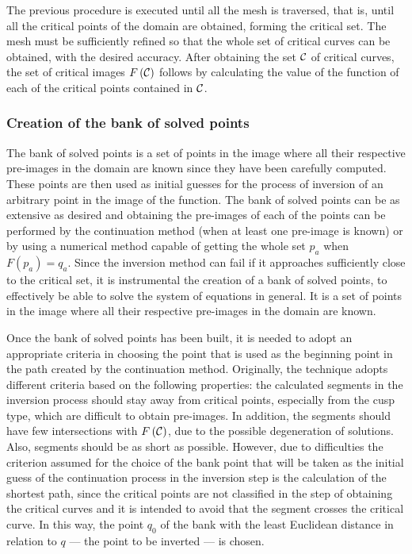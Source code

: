 \documentclass[journal=iecred,manuscript=article]{achemso}
\theoremstyle{definition}
\theoremstyle{remark}
\begin{document}
The previous procedure is executed until all the mesh is traversed, that is, until all the critical points of the domain are obtained, forming the critical set. 
 The mesh must be sufficiently refined so that the
 whole set of  critical curves can be obtained,
  with the desired accuracy. After obtaining the set $ {\cal C} $ of critical curves, the set of critical images 
  $F\left({\cal C}\right) $ follows by calculating the value of the function of each of the critical points contained in $ {\cal C} $.

\subsubsection{Creation of the bank of solved points}
The bank of solved points is a set of points in the image 
where all their respective pre-images in the 
domain are known since they have been carefully 
computed. 
These points are then used as initial guesses for the process 
of inversion of an arbitrary point in the image of the 
function. The bank of solved points can be as extensive as desired and obtaining the pre-images of each of the points can be performed by the continuation method (when at least one
pre-image is known)
 or by using a numerical method capable of getting the whole set $ p_{a} $ when $F\left(p_{a}\right) = q_{a} $.
Since the inversion method can fail if it approaches sufficiently close to the critical set, it is instrumental the  creation of a bank of solved points, 
 to effectively be able to solve the system of equations
 in general.
  It is a set of points in the image where all their respective pre-images in the domain are known. 

Once  the bank of solved points has been built,
 it is needed to adopt an appropriate criteria in choosing the point that is  used as the beginning point in the path 
 created by the continuation method. Originally, the technique adopts different criteria based on the following properties: the calculated segments in the inversion process should stay away from critical points, especially from  the 
 cusp type, which are difficult to obtain pre-images. In addition, the segments should have few intersections with $ F\left({\cal C}\right) $, due to the possible degeneration of solutions. Also, segments should be as short as possible. However, due to difficulties the criterion assumed for the choice of the bank point that will be taken as the initial guess of the continuation process in the inversion step is the calculation of the shortest path, since the critical points are not classified in the step of obtaining the critical curves and it is intended to avoid that the segment crosses the critical curve. In this way, the point $ q_{0} $ of the bank with the least Euclidean distance in relation to $ q $ --- the point to be inverted --- is chosen.
\end{document}
